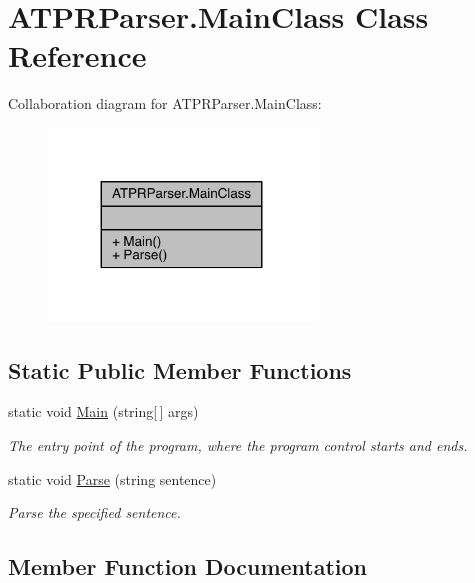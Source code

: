 \hypertarget{class_a_t_p_r_parser_1_1_main_class}{}\section{A\+T\+P\+R\+Parser.\+Main\+Class Class Reference}
\label{class_a_t_p_r_parser_1_1_main_class}


Collaboration diagram for A\+T\+P\+R\+Parser.\+Main\+Class\+:
\nopagebreak
\begin{figure}[H]
\begin{center}
\leavevmode
\includegraphics[width=200pt]{de/d7a/class_a_t_p_r_parser_1_1_main_class__coll__graph}
\end{center}
\end{figure}
\subsection*{Static Public Member Functions}
\begin{DoxyCompactItemize}
\item 
static void \hyperlink{class_a_t_p_r_parser_1_1_main_class_ade65079470bbddf6148ad515cb75e389}{Main} (string\mbox{[}$\,$\mbox{]} args)
\begin{DoxyCompactList}\small\item\em The entry point of the program, where the program control starts and ends. \end{DoxyCompactList}\item 
static void \hyperlink{class_a_t_p_r_parser_1_1_main_class_af792fa155ddd2ec39f158270b2dae720}{Parse} (string sentence)
\begin{DoxyCompactList}\small\item\em Parse the specified sentence. \end{DoxyCompactList}\end{DoxyCompactItemize}


\subsection{Member Function Documentation}
\hypertarget{class_a_t_p_r_parser_1_1_main_class_ade65079470bbddf6148ad515cb75e389}{}\label{class_a_t_p_r_parser_1_1_main_class_ade65079470bbddf6148ad515cb75e389} 

